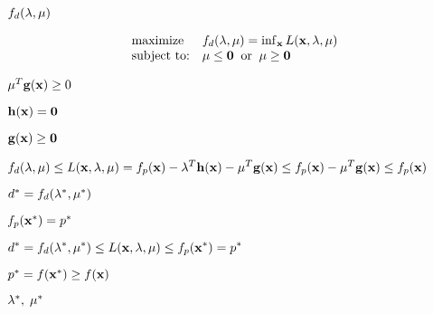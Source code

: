 \documentclass{article}
\def\lthtmlcheckvsize{\ifdim\ht\sizebox<\vsize 
  \ifdim\wd\sizebox<\hsize\expandafter\hfill\fi \expandafter\vfill
  \else\expandafter\vss\fi}%
\begin{document}
{\newpage\clearpage
{}%
$ f_d({\bf\lambda},{\bf\mu})$%
\lthtmlindisplaymathZ
\lthtmlcheckvsize\clearpage}

{\newpage\clearpage
{}%
\begin{displaymath}\begin{array}{ll}
\mbox{maximize} & f_d({\bf\lambda},{\bf\mu})
=\inf_{\bf x}L({\bf x},{\bf\lambda},{\bf\mu})\\
\mbox{subject to:} & {\bf\mu}\le{\bf0}\;\;\mbox{or}\;\;
{\bf\mu}\ge{\bf0}
\end{array}\end{displaymath}%
\lthtmldisplayZ
\lthtmlcheckvsize\clearpage}

{\newpage\clearpage
{}%
$ {\bf\mu}^T{\bf g}({\bf x})\ge 0$%
\lthtmlindisplaymathZ
\lthtmlcheckvsize\clearpage}

{\newpage\clearpage
{}%
$ {\bf h}({\bf x})={\bf0}$%
\lthtmlindisplaymathZ
\lthtmlcheckvsize\clearpage}

{\newpage\clearpage
{}%
$ {\bf g}({\bf x})\ge{\bf0}$%
\lthtmlindisplaymathZ
\lthtmlcheckvsize\clearpage}

{\newpage\clearpage
{}%
$\displaystyle f_d({\bf\lambda},{\bf\mu})\le L({\bf x},{\bf\lambda},{\bf\mu})
=f_p({\bf x})-{\bf\lambda}^T{\bf h}({\bf x})-{\bf\mu}^T{\bf g}({\bf x})
\le f_p({\bf x})-{\bf\mu}^T{\bf g}({\bf x}) \le f_p({\bf x})$%
\lthtmlindisplaymathZ
\lthtmlcheckvsize\clearpage}

{\newpage\clearpage
{}%
$ d^*=f_d({\bf\lambda}^*,{\bf\mu}^*)$%
\lthtmlindisplaymathZ
\lthtmlcheckvsize\clearpage}

{\newpage\clearpage
{}%
$ f_p({\bf x}^*)=p^*$%
\lthtmlindisplaymathZ
\lthtmlcheckvsize\clearpage}

{\newpage\clearpage
{}%
$\displaystyle d^*=f_d({\bf\lambda}^*,{\bf\mu}^*)\le L({\bf x},{\bf\lambda},{\bf\mu})
\le f_p({\bf x}^*)=p^*$%
\lthtmlindisplaymathZ
\lthtmlcheckvsize\clearpage}

{\newpage\clearpage
{}%
$ p^*=f({\bf x}^*)\ge f({\bf x})$%
\lthtmlindisplaymathZ
\lthtmlcheckvsize\clearpage}

{\newpage\clearpage
{}%
$ {\bf\lambda}^*,\;{\bf\mu}^*$%
\lthtmlindisplaymathZ
\lthtmlcheckvsize\clearpage}
\end{document}
